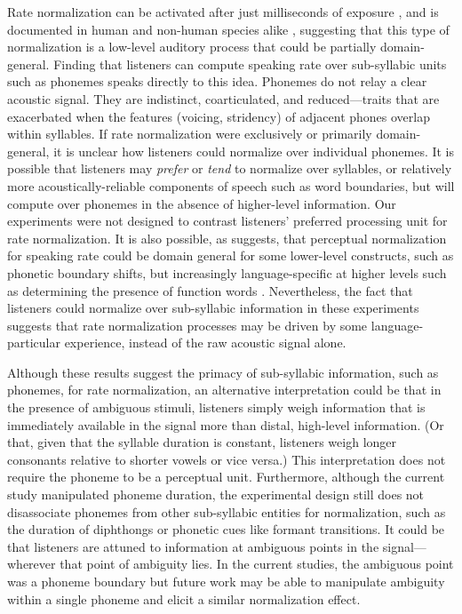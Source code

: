 \documentclass[preprint]{JASA}
\begin{document}
Rate normalization can be activated after just milliseconds of exposure \citep{reinischSpeakerspecificProcessingLocal2016}, and is documented in human and non-human species alike \citep{welchEffectsSyllablefinalSegment2009}, suggesting that this type of normalization is a low-level auditory process that could be partially domain-general. Finding that listeners can compute speaking rate over sub-syllabic units such as phonemes speaks directly to this idea. Phonemes do not relay a clear acoustic signal. They are indistinct, coarticulated, and reduced---traits that are exacerbated when the features (voicing, stridency) of adjacent phones overlap within syllables. If rate normalization were exclusively or primarily domain-general, it is unclear how listeners could normalize over individual phonemes. It is possible that listeners may \textit{prefer} or \textit{tend} to normalize over syllables, or relatively more acoustically-reliable components of speech such as word boundaries, but will compute over phonemes in the absence of higher-level information. Our experiments were not designed to contrast listeners' preferred processing unit for rate normalization. It is also possible, as \citet{boskerAccountingRatedependentCategory2017} suggests, that perceptual normalization for speaking rate could be domain general for some lower-level constructs, such as phonetic boundary shifts, but increasingly language-specific at higher levels such as determining the presence of function words \citep{dilleyAlteringContextSpeech2010}. Nevertheless, the fact that listeners could normalize over sub-syllabic information in these experiments suggests that rate normalization processes may be driven by some language-particular experience, instead of the raw acoustic signal alone. 

Although these results suggest the primacy of sub-syllabic information, such as phonemes, for rate normalization, an alternative interpretation could be that in the presence of ambiguous stimuli, listeners simply weigh information that is immediately available in the signal more than distal, high-level information. (Or that, given that the syllable duration is constant, listeners weigh longer consonants relative to shorter vowels or vice versa.) This interpretation does not require the phoneme to be a perceptual unit. Furthermore, although the current study manipulated phoneme duration, the experimental design still does not disassociate phonemes from other sub-syllabic entities for normalization, such as the duration of diphthongs or phonetic cues like formant transitions. It could be that listeners are attuned to information at ambiguous points in the signal---wherever that point of ambiguity lies. In the current studies, the ambiguous point was a phoneme boundary but future work may be able to manipulate ambiguity within a single phoneme and elicit a similar normalization effect. 
\end{document}
